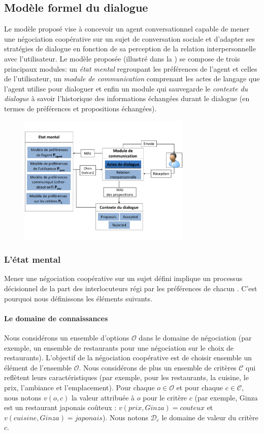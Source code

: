\documentclass [french]{sig-alternate-05-2015}
\begin{document}
\subsection{Modèle formel du dialogue}
\par Le modèle proposé vise à concevoir un agent conversationnel capable de mener une négociation coopérative sur un sujet de conversation sociale et d'adapter ses stratégies de dialogue en fonction de sa perception de la relation interpersonnelle avec l'utilisateur. Le modèle proposée (illustré dans
 la ) se compose de trois principaux modules: un \textit{état mental} regroupant les préférences de l'agent et celles de l'utilisateur, un \textit{module de communication} comprenant les actes de langage que l'agent utilise pour dialoguer et enfin un module qui sauvegarde le \textit{contexte du dialogue} à savoir l'historique des informations échangées durant le dialogue (en termes de préférences et propositions échangées).
\begin{figure}
	\centerline{\includegraphics [width=3.25in]{figs/modele_v1.pdf}}
\end{figure}

\subsubsection{L'état mental}

Mener une négociation coopérative sur un sujet défini implique un processus décisionnel de la part des interlocuteurs régi par les préférences de chacun \cite{laver1981linguistic}. C'est pourquoi nous définissons les éléments suivants.

\paragraph{Le domaine de connaissances}
Nous considérons un ensemble d'options $\mathcal{O}$ dans le domaine de négociation (par exemple, un ensemble de restaurants pour une négociation sur le choix de restaurants). L'objectif de la négociation coopérative est de choisir ensemble un élément de l'ensemble $\mathcal{O}$. Nous considérons de plus un ensemble de critères $\mathcal{C}$ qui reflètent leurs caractéristiques (par exemple, pour les restaurants, la cuisine, le prix, l'ambiance et l'emplacement). Pour chaque $o\in\mathcal{O}$ et pour chaque $c\in\mathcal{C}$, nous notons $v(o,c)$ la valeur attribuée à $o$ pour le critère $c$ (par exemple, Ginza est un restaurant japonais coûteux : $v(prix, Ginza) = couteux $ et $ v (cuisine, Ginza) = japonais$). Nous notons $\mathcal{D}_c$ le domaine de valeur du critère $c$.
\end{document}
